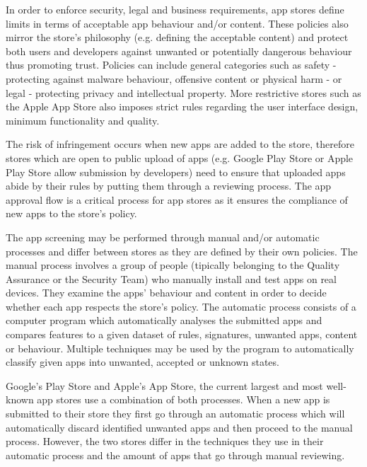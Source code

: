 In order to enforce security, legal and business requirements, app stores define limits in terms of acceptable app behaviour and/or content. These policies also mirror the store's philosophy (e.g. defining the acceptable content) and protect both users and developers against unwanted or potentially dangerous behaviour thus promoting trust. Policies can include general categories such as safety - protecting against malware behaviour, offensive content or physical harm - or legal - protecting privacy and intellectual property. More restrictive stores such as the Apple App Store also imposes strict rules regarding the user interface design, minimum functionality and quality. \cite{GooglePolicyWebsite} \cite{ApplePolicyWebsite}

The risk of infringement occurs when new apps are added to the store, therefore stores which are open to public upload of apps (e.g. Google Play Store or Apple Play Store allow submission by developers) need to ensure that uploaded apps abide by their rules by putting them through a reviewing process. The app approval flow is a critical process for app stores as it ensures the compliance of new apps to the store's policy.

The app screening may be performed through manual and/or automatic processes and differ between stores as they are defined by their own policies. The manual process involves a group of people (tipically belonging to the Quality Assurance or the Security Team) who manually install and test apps on real devices. They examine the apps' behaviour and content in order to decide whether each app respects the store's policy. The automatic process consists of a computer program which automatically analyses the submitted apps and compares features to a given dataset of rules, signatures, unwanted apps, content or behaviour. Multiple techniques may be used by the program to automatically classify given apps into unwanted, accepted or unknown states\cite{Bhattacharya2017}.

Google's Play Store and Apple's App Store, the current largest and most well-known app stores use a combination of both processes. When a new app is submitted to their store they first go through an automatic process which will automatically discard identified unwanted apps and then proceed to the manual process. However, the two stores differ in the techniques they use in their automatic process and the amount of apps that go through manual reviewing\cite{AppleInsiderWebsite}\cite{AndroidWhitePaper}.

